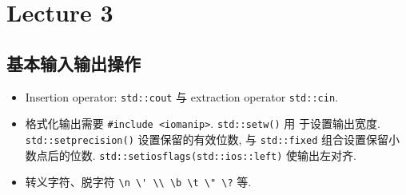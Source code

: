 \documentclass[a4paper,UTF8]{ctexart}
\begin{document}
\pagestyle{plain}
\setlength{\parindent}{0pt}


\setcounter{section}{2}
\section{Lecture 3}

\subsection{基本输入输出操作}
\begin{itemize}[leftmargin=0pt, rightmargin=0cm, labelwidth=0.8cm, labelsep=0.2cm]
\item Insertion operator: \lstinline{std::cout} 与 extraction operator
  \lstinline{std::cin}.
\item 格式化输出需要 \lstinline{#include <iomanip>}. \lstinline{std::setw()} 用
  于设置输出宽度. \lstinline{std::setprecision()} 设置保留的有效位数, 与
  \lstinline{std::fixed} 组合设置保留小数点后的位数. \lstinline{std::setiosflags(std::ios::left)} 使输出左对齐.
\item 转义字符、脱字符 \lstinline{\n \' \\ \b \t \" \?} 等.
\end{itemize}
\end{document}
